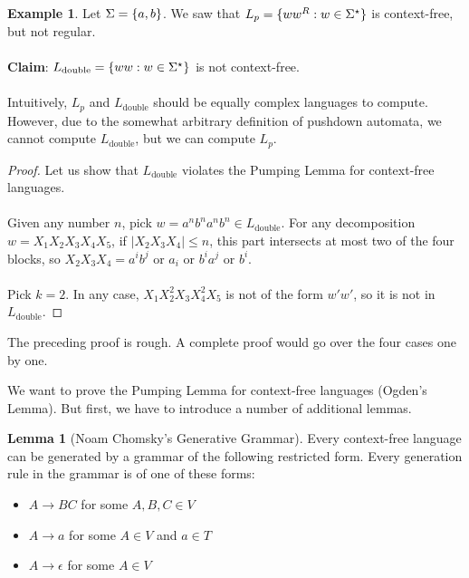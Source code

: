 \documentclass[]{article}
\DeclarePairedDelimiter{\set}{\lbrace}{\rbrace}
\theoremstyle{definition}
\newtheorem*{lemma}{Lemma}
\newtheorem{ex}{Example}[section]
\begin{document}
      \begin{ex}
        Let $\Sigma = \set{a, b}$. We saw that $L_p = \set{w w^R : w \in \Sigma^\star}$ is context-free, but not regular.
        \\ \\
        \textbf{Claim}: $L_\text{double} = \set{ ww : w  \in \Sigma^\star }$ is not context-free.
        \\ \\
        Intuitively, $L_p$ and $L_\text{double}$ should be equally complex languages to compute. However, due to the somewhat arbitrary definition of pushdown automata, we cannot compute $L_\text{double}$, but we can compute $L_p$.

        \begin{proof}
          Let us show that $L_\text{double}$ violates the Pumping Lemma for context-free languages.
          \\ \\
          Given any number $n$, pick $w = a^n b^n a^n b^n \in L_\text{double}$. For any decomposition $w = X_1 X_2 X_3 X_4 X_5$, if $|X_2 X_3 X_4| \le n$, this part intersects at most two of the four blocks, so $X_2 X_3 X_4 = a^i b^j$ or $a_i$ or $b^i a^j$ or $b^i$.
          \\ \\
          Pick $k = 2$. In any case, $X_1 X_2^2 X_3 X_4^2 X_5$ is not of the form $w' w'$, so it is not in $L_\text{double}$.
        \end{proof}

        The preceding proof is rough. A complete proof would go over the four cases one by one.
      \end{ex}

      We want to prove the Pumping Lemma for context-free languages (Ogden's Lemma). But first, we have to introduce a number of additional lemmas.

      \begin{lemma}[Noam Chomsky's Generative Grammar]
        Every context-free language can be generated by a grammar of the following restricted form. Every generation rule in the grammar is of one of these forms:
        \begin{itemize}
          \item $A \to BC$ for some $A, B, C \in V$
          \item $A \to a$ for some $A \in V$ and $a \in T$
          \item $A \to \epsilon$ for some $A \in V$
        \end{itemize}
      \end{lemma}
\end{document}
